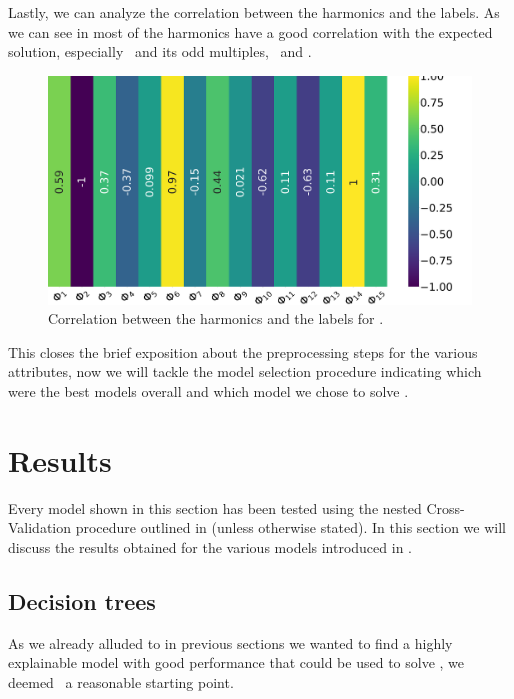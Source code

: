 Lastly, we can analyze the correlation between the harmonics and the labels. As we can see in
 most of the harmonics have a good correlation with the expected solution,
especially \phin[2]\ and its odd multiples, \phin[1]\ and \phin[12].
\begin{figure}[!ht]
	\centering
	\includegraphics[width=0.7\linewidth]{img/Phi_label_corr.png}
	\caption{Correlation between the harmonics and the labels for \phin.} \label{fig:phi-lcorr}
\end{figure}

\medskip

This closes the brief exposition about the preprocessing steps for the various attributes, now we will
tackle the model selection procedure indicating which were the best models overall and which model
we chose to solve \qrp.

\section{Results}
\label{sec:results-qrp}
Every model shown in this section has been tested using the nested Cross-Validation procedure
outlined in  (unless otherwise stated). In this section we will discuss the results obtained for the various models
introduced in .

\subsection{Decision trees}
\label{sec:qrp-dt}
As we already alluded to in previous sections we wanted to find a highly explainable model with good
performance that could be used to solve \qrp, we deemed \dts\ a reasonable starting point.


